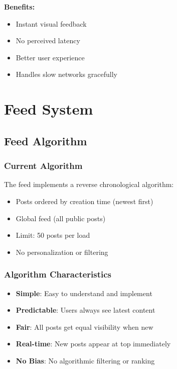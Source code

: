 \documentclass[12pt,a4paper]{report}
\begin{document}
\textbf{Benefits:}
\begin{itemize}
    \item Instant visual feedback
    \item No perceived latency
    \item Better user experience
    \item Handles slow networks gracefully
\end{itemize}

\chapter{Feed System}

\section{Feed Algorithm}

\subsection{Current Algorithm}

The feed implements a reverse chronological algorithm:

\begin{itemize}
    \item Posts ordered by creation time (newest first)
    \item Global feed (all public posts)
    \item Limit: 50 posts per load
    \item No personalization or filtering
\end{itemize}

\subsection{Algorithm Characteristics}

\begin{itemize}
    \item \textbf{Simple}: Easy to understand and implement
    \item \textbf{Predictable}: Users always see latest content
    \item \textbf{Fair}: All posts get equal visibility when new
    \item \textbf{Real-time}: New posts appear at top immediately
    \item \textbf{No Bias}: No algorithmic filtering or ranking
\end{itemize}
\end{document}
